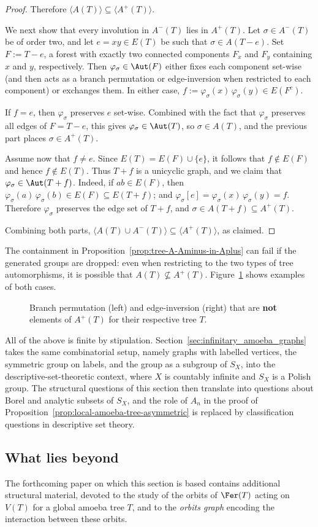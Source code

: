 \begin{proof}
    Therefore $\langle A(T)\rangle\subseteq\langle A^+(T)\rangle$.

    \medskip

    We next show that every involution in $A^-(T)$ lies in $A^+(T)$.
    Let $\sigma\in A^-(T)$ be of order two, and let $e=xy\in E(T)$ be such that $\sigma\in A(T-e)$.
    Set $F:=T-e$, a forest with exactly two connected components $F_x$ and $F_y$ containing $x$ and $y$, respectively.
    Then $\varphi_\sigma\in\Aut(F)$ either fixes each component set-wise (and then acts as a branch permutation or edge-inversion when restricted to each component) or exchanges them.
    In either case, $f:=\varphi_\sigma(x)\,\varphi_\sigma(y)\in E(F^c)$.

    If $f=e$, then $\varphi_\sigma$ preserves $e$ set-wise.
    Combined with the fact that $\varphi_\sigma$ preserves all edges of $F=T-e$, this gives $\varphi_\sigma\in\Aut(T)$, so $\sigma\in A(T)$, and the previous part places $\sigma\in A^+(T)$.

    Assume now that $f\neq e$.
    Since $E(T)=E(F)\cup\{e\}$, it follows that $f\notin E(F)$ and hence $f\notin E(T)$.
    Thus $T+f$ is a unicyclic graph, and we claim that $\varphi_\sigma\in\Aut(T+f)$.
    Indeed, if $ab\in E(F)$, then $\varphi_\sigma(a)\,\varphi_\sigma(b)\in E(F)\subseteq E(T+f)$; and $\varphi_\sigma[e]=\varphi_\sigma(x)\,\varphi_\sigma(y)=f$.
    Therefore $\varphi_\sigma$ preserves the edge set of $T+f$, and $\sigma\in A(T+f)\subseteq A^+(T)$.

    Combining both parts, $\langle A(T)\cup A^-(T)\rangle\subseteq\langle A^+(T)\rangle$, as claimed.
\end{proof}

The containment in Proposition~\ref{prop:tree-A-Aminus-in-Aplus} can fail if the generated groups are dropped: even when restricting to the two types of tree automorphisms, it is possible that $A(T)\not\subseteq A^+(T)$.
Figure~\ref{fig:counterexample_trees} shows examples of both cases.

\begin{figure}[ht!]
    \centering
    
    \caption{Branch permutation (left) and edge-inversion (right) that are \textbf{not} elements of $A^+(T)$ for their respective tree $T$.}
    \label{fig:counterexample_trees}
\end{figure}

All of the above is finite by stipulation.
Section~\ref{sec:infinitary_amoeba_graphs} takes the same combinatorial setup, namely graphs with labelled vertices, the symmetric group on labels, and the \tFer group as a subgroup of $S_X$, into the descriptive-set-theoretic context, where $X$ is countably infinite and $S_X$ is a Polish group.
The structural questions of this section then translate into questions about Borel and analytic subsets of $S_X$, and the role of $A_n$ in the proof of Proposition~\ref{prop:local-amoeba-tree-asymmetric} is replaced by classification questions in descriptive set theory.

\subsection*{What lies beyond}

The forthcoming paper on which this section is based contains additional structural material, devoted to the study of the orbits of $\Fer(T)$ acting on $V(T)$ for a global amoeba tree $T$, and to the \emph{orbits graph} encoding the interaction between these orbits.
